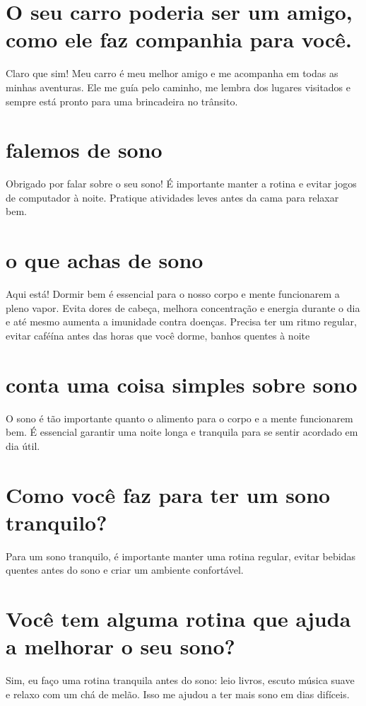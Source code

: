 \documentclass[11pt,a4paper]{article}
\begin{document}
\section{O seu carro poderia ser um amigo, como ele faz companhia para você.}
Claro que sim! Meu carro é meu melhor amigo e me acompanha em todas as minhas aventuras. Ele me guía pelo caminho, me lembra dos lugares visitados e sempre está pronto para uma brincadeira no trânsito.

\section{falemos de sono}
Obrigado por falar sobre o seu sono! É importante manter a rotina e evitar jogos de computador à noite. Pratique atividades leves antes da cama para relaxar bem.

\section{o que achas de sono}
Aqui está! Dormir bem é essencial para o nosso corpo e mente funcionarem a pleno vapor. Evita dores de cabeça, melhora concentração e energia durante o dia e até mesmo aumenta a imunidade contra doenças. Precisa ter um ritmo regular, evitar caféína antes das horas que você dorme, banhos quentes à noite

\section{conta uma coisa simples sobre sono}
O sono é tão importante quanto o alimento para o corpo e a mente funcionarem bem. É essencial garantir uma noite longa e tranquila para se sentir acordado em dia útil.

\section{Como você faz para ter um sono tranquilo?}
Para um sono tranquilo, é importante manter uma rotina regular, evitar bebidas quentes antes do sono e criar um ambiente confortável.

\section{Você tem alguma rotina que ajuda a melhorar o seu sono?}
Sim, eu faço uma rotina tranquila antes do sono: leio livros, escuto música suave e relaxo com um chá de melão. Isso me ajudou a ter mais sono em dias difíceis.
\end{document}
